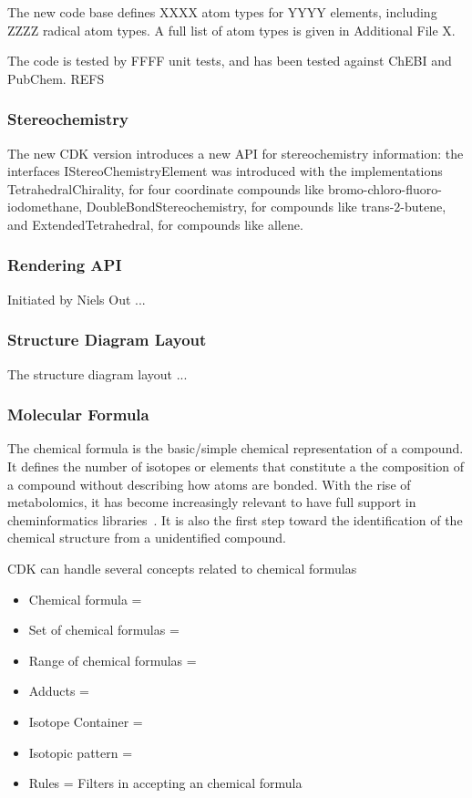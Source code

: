 \documentclass[10pt]{bmcart}
\begin{document}
  The new code base defines XXXX atom types for YYYY elements, including ZZZZ radical
  atom types. A full list of atom types is given in Additional File X.
  
  The code is tested by FFFF unit tests, and has been tested against ChEBI and PubChem. REFS

  \subsubsection*{Stereochemistry}

  The new CDK version introduces a new API for stereochemistry information: the interfaces
  IStereoChemistryElement was introduced with the implementations TetrahedralChirality,
  for four coordinate compounds like bromo-chloro-fluoro-iodomethane,
  DoubleBondStereochemistry, for compounds like trans-2-butene, and
  ExtendedTetrahedral, for compounds like allene.

  \subsubsection*{Rendering API}

  Initiated by Niels Out ...

  \subsubsection*{Structure Diagram Layout}

  The structure diagram layout ... %

  \subsubsection*{Molecular Formula}

The chemical formula is the basic/simple chemical representation of a compound.
It defines the number of isotopes or elements that constitute a the composition
of a compound without describing how atoms are bonded. With the rise of metabolomics,
it has become increasingly relevant to have full support in cheminformatics
libraries~\cite{RojasCherto2011}.
It is also the first step
toward the identification of the chemical structure from a unidentified compound.

CDK can handle several concepts related to chemical formulas
\begin{itemize}
\item Chemical formula =
\item Set of chemical formulas =
\item Range of chemical formulas =
\item Adducts =
\item Isotope Container =
\item Isotopic pattern = 
\item Rules = Filters in accepting an chemical formula
\end{itemize}
\end{document}
